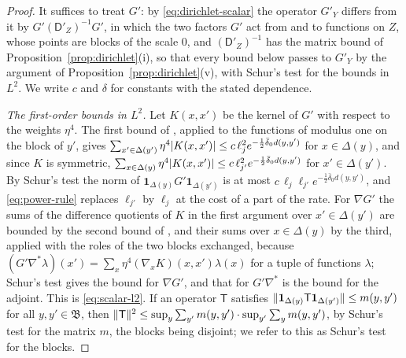 \documentclass[11pt]{preprint}
\DeclarePairedDelimiter{\abs}{\lvert}{\rvert}
\DeclarePairedDelimiter{\norm}{\lVert}{\rVert}
\numberwithin{equation}{section}
\theoremstyle{definition}
\theoremstyle{remark}
\theoremstyle{plain}
\begin{document}
\begin{proof}
It suffices to treat $G'$: by \eqref{eq:dirichlet-scalar} the operator $G'_Y$ differs from it by $G'(\mathsf D'_Z)^{-1}G'$, in which the two factors $G'$ act from and to functions on $Z$, whose points are blocks of the scale $0$, and $(\mathsf D'_Z)^{-1}$ has the matrix bound of Proposition~\ref{prop:dirichlet}(i), so that every bound below passes to $G'_Y$ by the argument of Proposition~\ref{prop:dirichlet}(v), with Schur's test for the bounds in $L^2$. We write $c$ and $\delta$ for constants with the stated dependence.

\emph{The first-order bounds in $L^2$.} Let $K(x, x')$ be the kernel of $G'$ with respect to the weights $\eta^4$. The first bound of \cite[(2.67)]{BalabanPRT2}, applied to the functions of modulus one on the block of $y'$, gives $\sum_{x' \in \Delta(y')}\eta^4\abs{K(x, x')} \leq c\,\ell_j^2e^{-\frac12\bar\delta_0d(y, y')}$ for $x \in \Delta(y)$, and since $K$ is symmetric, $\sum_{x \in \Delta(y)}\eta^4\abs{K(x, x')} \leq c\,\ell_{j'}^2e^{-\frac12\bar\delta_0d(y, y')}$ for $x' \in \Delta(y')$. By Schur's test the norm of $\mathbf 1_{\Delta(y)}G'\mathbf 1_{\Delta(y')}$ is at most $c\,\ell_j\ell_{j'}e^{-\frac12\bar\delta_0d(y, y')}$, and \eqref{eq:power-rule} replaces $\ell_{j'}$ by $\ell_j$ at the cost of a part of the rate. For $\nabla G'$ the sums of the difference quotients of $K$ in the first argument over $x' \in \Delta(y')$ are bounded by the second bound of \cite[(2.67)]{BalabanPRT2}, and their sums over $x \in \Delta(y)$ by the third, applied with the roles of the two blocks exchanged, because $(G'\nabla^*\lambda)(x') = \sum_x\eta^4(\nabla_xK)(x, x')\lambda(x)$ for a tuple of functions $\lambda$; Schur's test gives the bound for $\nabla G'$, and that for $G'\nabla^*$ is the bound for the adjoint. This is \eqref{eq:scalar-l2}. If an operator $\mathsf T$ satisfies $\norm{\mathbf 1_{\Delta(y)}\mathsf T\mathbf 1_{\Delta(y')}} \leq m(y, y')$ for all $y, y' \in \mathfrak B$, then $\norm{\mathsf T}^2 \leq \sup_y\sum_{y'}m(y, y') \cdot \sup_{y'}\sum_ym(y, y')$, by Schur's test for the matrix $m$, the blocks being disjoint; we refer to this as Schur's test for the blocks.


\end{proof}
\end{document}
